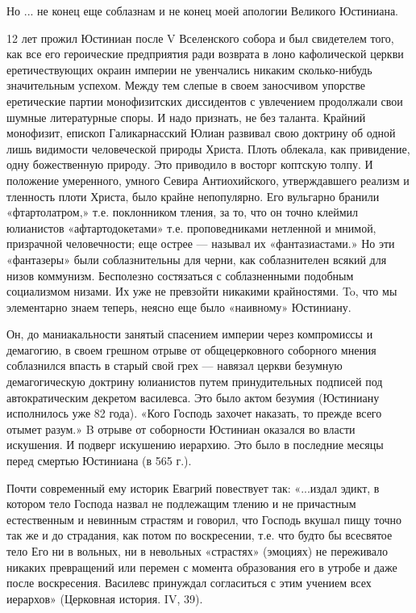 Но ... не конец еще соблазнам и не конец моей апологии Великого Юстиниана.

12 лет прожил Юстиниан после V Вселенского собора и был свидетелем того, как
все его героические предприятия ради возврата в лоно кафолической церкви
еретичествующих окраин империи не увенчались никаким сколько-нибудь
значительным успехом. Между тем слепые в своем заносчивом упорстве еретические
партии монофизитских диссидентов с увлечением продолжали свои шумные
литературные споры. И надо признать, не без таланта. Крайний монофизит, епископ
Галикарнасский Юлиан развивал свою доктрину об одной лишь видимости
человеческой природы Христа. Плоть облекала, как привидение, одну божественную
природу. Это приводило в восторг коптскую толпу. И положение умеренного, умного
Севира Антиохийского, утверждавшего реализм и тленность плоти Христа, было
крайне непопулярно. Его вульгарно бранили «фтартолатром,» т.е. поклонником
тления, за то, что он точно клеймил юлианистов «афтартодокетами» т.е.
проповедниками нетленной и мнимой, призрачной человечности; еще острее —
называл их «фантазиастами.» Но эти «фантазеры» были соблазнительны для черни,
как соблазнителен всякий для низов коммунизм. Бесполезно состязаться с
соблазненными подобным социализмом низами. Их уже не превзойти никакими
крайностями. To, что мы элементарно знаем теперь, неясно еще было «наивному»
Юстиниану.

Он, до маниакальности занятый спасением империи через компромиссы и демагогию,
в своем грешном отрыве от общецерковного соборного мнения соблазнился впасть в
старый свой грех — навязал церкви безумную демагогическую доктрину юлианистов
путем принудительных подписей под автократическим декретом василевса. Это было
актом безумия (Юстиниану исполнилось уже 82 года). «Кого Господь захочет
наказать, то прежде всего отымет разум.» B отрыве от соборности Юстиниан
оказался во власти искушения. И подверг искушению иерархию. Это было в
последние месяцы перед смертью Юстиниана (в 565 г.).

Почти современный ему историк Евагрий повествует так: «...издал эдикт, в
котором тело Господа назвал не подлежащим тлению и не причастным естественным и
невинным страстям и говорил, что Господь вкушал пищу точно так же и до
страдания, как потом по воскресении, т.е. что будто бы всесвятое тело Его ни в
вольных, ни в невольных «страстях» (эмоциях) не переживало никаких превращений
или перемен с момента образования его в утробе и даже после воскресения.
Василевс принуждал согласиться с этим учением всех иерархов» (Церковная
история. IV, 39).


